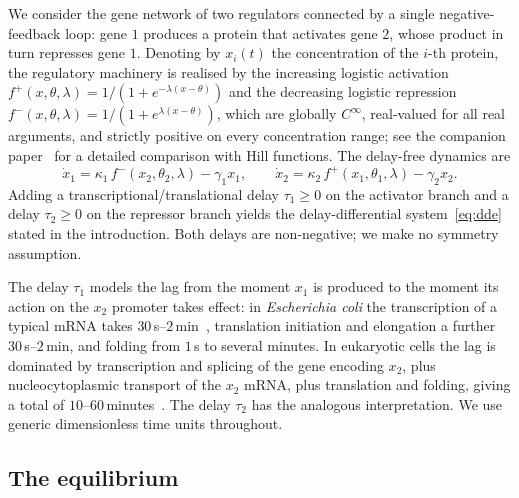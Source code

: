 \documentclass[sn-mathphys,Numbered]{sn-jnl}
\theoremstyle{thmstyleone}
\theoremstyle{thmstyletwo}
\theoremstyle{thmstylethree}
\begin{document}
We consider the gene network of two regulators connected by a single
negative-feedback loop: gene $1$ produces a protein that activates gene $2$,
whose product in turn represses gene $1$. Denoting by $x_i(t)$ the
concentration of the $i$-th protein, the regulatory machinery is realised by
the increasing logistic activation
$f^+(x,\theta,\lambda) = 1/(1+e^{-\lambda(x-\theta)})$ and the decreasing
logistic repression $f^-(x,\theta,\lambda) = 1/(1+e^{\lambda(x-\theta)})$,
which are globally $C^\infty$, real-valued for all real arguments, and
strictly positive on every concentration range; see the companion
paper~\cite{belgacem2026logistic} for a detailed comparison with Hill
functions. The delay-free dynamics are
\begin{equation}
\dot{x}_1 = \kappa_1\,f^-(x_2,\theta_2,\lambda) - \gamma_1 x_1,
\qquad
\dot{x}_2 = \kappa_2\,f^+(x_1,\theta_1,\lambda) - \gamma_2 x_2.
\label{eq:ode}
\end{equation}
Adding a transcriptional/translational delay $\tau_1\geq 0$ on the activator
branch and a delay $\tau_2\geq 0$ on the repressor branch yields the
delay-differential system~\eqref{eq:dde} stated in the introduction. Both
delays are non-negative; we make no symmetry assumption.

The delay $\tau_1$ models the lag from the moment $x_1$ is produced to the
moment its action on the $x_2$ promoter takes effect: in
\textit{Escherichia coli} the transcription of a typical mRNA takes
$30$\,s--$2$\,min~\cite{young1976polypeptide}, translation initiation and
elongation a further $30$\,s--$2$\,min, and folding from $1$\,s to several
minutes. In eukaryotic cells the lag is dominated by transcription and
splicing of the gene encoding $x_2$, plus nucleocytoplasmic transport of
the $x_2$ mRNA, plus translation and folding, giving a total of
$10$--$60$\,minutes~\cite{monk2003oscillatory}. The delay $\tau_2$ has the
analogous interpretation. We use generic dimensionless time units throughout.

\subsection{The equilibrium}
\end{document}
